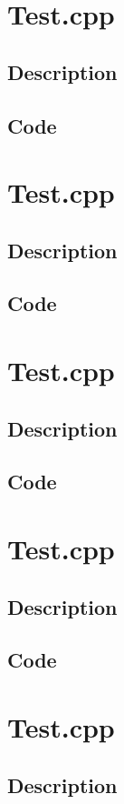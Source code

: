     \section{Test.cpp}
        \subsection{Description}
        \subsection{Code}
    \section{Test.cpp}
        \subsection{Description}
        \subsection{Code}
    \section{Test.cpp}
        \subsection{Description}
        \subsection{Code}
    \section{Test.cpp}
        \subsection{Description}
        \subsection{Code}
    \section{Test.cpp}
        \subsection{Description}
